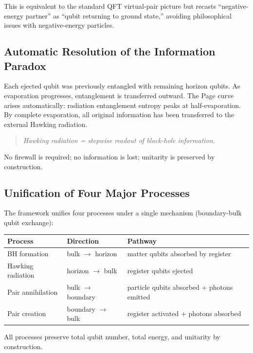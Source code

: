 \documentclass[11pt,a4paper]{article}
\begin{document}
This is equivalent to the standard QFT virtual-pair picture but recasts ``negative-energy partner'' as ``qubit returning to ground state,'' avoiding philosophical issues with negative-energy particles.

\subsection{Automatic Resolution of the Information Paradox}

Each ejected qubit was previously entangled with remaining horizon qubits. As evaporation progresses, entanglement is transferred outward. The Page curve~\cite{Page1993} arises automatically: radiation entanglement entropy peaks at half-evaporation. By complete evaporation, all original information has been transferred to the external Hawking radiation.

\begin{quote}
\textit{Hawking radiation = stepwise readout of black-hole information.}
\end{quote}

No firewall is required; no information is lost; unitarity is preserved by construction.

\subsection{Unification of Four Major Processes}

The framework unifies four processes under a single mechanism (boundary-bulk qubit exchange):

\begin{table}[h]
\centering
\begin{tabular}{lll}
\toprule
\textbf{Process} & \textbf{Direction} & \textbf{Pathway} \\
\midrule
BH formation & bulk $\to$ horizon & matter qubits absorbed by register \\
Hawking radiation & horizon $\to$ bulk & register qubits ejected \\
Pair annihilation & bulk $\to$ boundary & particle qubits absorbed + photons emitted \\
Pair creation & boundary $\to$ bulk & register activated + photons absorbed \\
\bottomrule
\end{tabular}
\end{table}

All processes preserve total qubit number, total energy, and unitarity by construction.
\end{document}
